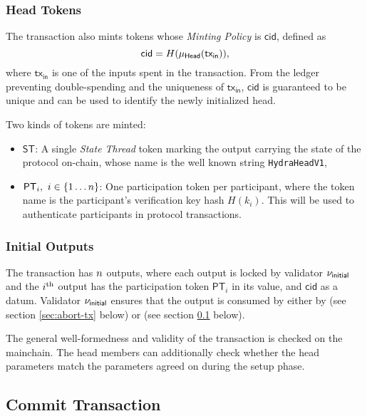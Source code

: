 \subsubsection{Head Tokens}

The \mtxInit{} transaction also mints tokens whose \emph{Minting Policy} is $\mathsf{cid}$, defined as 
$$
\mathsf{cid} = H(\mu_\mathsf{Head}(\mathsf{tx_{in}})),
$$
where $\mathsf{tx_{in}}$ is one of the inputs spent in the \mtxInit{} transaction. From the ledger preventing double-spending and the uniqueness of $\mathsf{tx_{in}}$, $\mathsf{cid}$ is guaranteed to be unique and can be used to identify the newly initialized head. 

Two kinds of tokens are minted:
\begin{itemize}
\item $\mathsf{ST}$: A single \emph{State Thread} token marking the output carrying the state of the protocol on-chain, whose name is the well known string \texttt{HydraHeadV1},
\item $\mathsf{PT}_i,\ i\in \{1 \dots n \}$: One participation token per participant, where the token name is the participant's verification key hash $H(k_i)$. This will be used to authenticate participants in protocol transactions.
\end{itemize}

\subsubsection{Initial Outputs}

The \mtxInit{} transaction has $n$ outputs, where each output is
locked by validator $\nu_\mathsf{initial}$ and the $i^{\text{th}}$ output has the participation
token $\mathsf{PT}_i$ in its value, and $\mathsf{cid}$ as a datum. Validator $\nu_\mathsf{initial}$
ensures that the output is consumed by either by \mtxAbort{} (see section \ref{sec:abort-tx} below) or \mtxCom{} (see section \ref{sec:commit-tx} below).

The general well-formedness and validity of the \mtxInit{} transaction is
checked on the mainchain. The head members can additionally check whether the head
parameters match the parameters agreed on during the setup phase.

\subsection{Commit Transaction}\label{sec:commit-tx}



